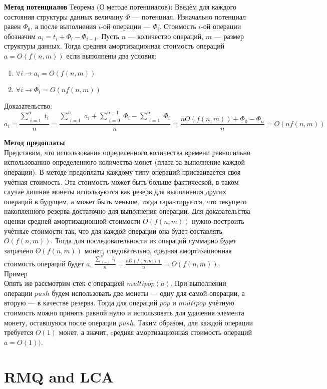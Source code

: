 \documentclass[a4paper]{article}
\begin{document}
\textbf{Метод потенциалов}
Теорема (О методе потенциалов): Введѐм для каждого состояния структуры данных величину $\Phi$ — потенциал. Изначально потенциал равен $\Phi_0$, а после выполнения $i$-ой операции — $\Phi_i$. Стоимость $i$-ой операции обозначим $a_i = t_i + \Phi_i - \Phi_{i-1}$. Пусть $n$ — количество операций, $m$ — размер структуры данных. Тогда средняя амортизационная стоимость операций $a=O(f(n,m))$ если выполнены два условия:
\begin{enumerate}
	\item $\forall i \rightarrow a_i = O(f(n,m))$
	\item $\forall i \rightarrow \Phi_i = O(nf(n,m))$
\end{enumerate}
Доказательство: 
$$ a_i = \frac{\sum_{\substack{i=1}}^n t_i}{n} = \frac{\sum_{\substack{i=1}}^n a_i + \sum_{\substack{i=0}}^{n-1} \Phi_i - \sum_{\substack{i=1}}^n \Phi_i}{n} = \frac{nO(f(n,m)) + \Phi_0 - \Phi_n}{n} = O(nf(n,m)) $$

\textbf{Метод предоплаты} \\
Представим, что использование определенного количества времени равносильно использованию определенного количества монет (плата за выполнение каждой операции). В методе предоплаты каждому типу операций присваивается своя учѐтная стоимость. Эта стоимость может быть больше фактической, в таком случае лишние монеты используются как резерв для выполнения других операций в будущем, а может быть меньше, тогда гарантируется, что текущего накопленного резерва достаточно для выполнения операции. Для доказательства оценки средней амортизационной стоимости $O(f(n,m))$ нужно построить учѐтные стоимости так, что для каждой операции она будет составлять $O(f(n,m))$. Тогда для последовательности из операций суммарно будет затрачено $O(f(n,m))$ монет, следовательно, cредняя амортизационная стоимость операций будет $a_ = \frac{\sum_{\substack{i=1}}^n t_i}{n} = \frac{nO(f(n,m))}{n} = O(f(n,m))$. \\
Пример \\
Опять же рассмотрим стек с операцией $multipop(a)$. При выполнении операции $push$ будем использовать две монеты — одну для самой операции, а вторую — в качестве резерва. Тогда для операций $pop$ и $multipop$ учѐтную стоимость можно принять равной нулю и использовать для удаления элемента монету, оставшуюся после операции $push$. Таким образом, для каждой операции требуется $O(1)$ монет, а значит, cредняя амортизационная стоимость операций $a=O(1))$.

\section{RMQ and LCA}
\end{document}
